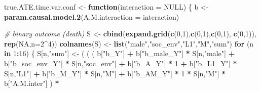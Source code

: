\documentclass[
]{book}
\newenvironment{Shaded}{\begin{snugshade}}{\end{snugshade}}
\newcommand{\AttributeTok}[1]{\textcolor[rgb]{0.13,0.29,0.53}{#1}}
\newcommand{\CommentTok}[1]{\textcolor[rgb]{0.56,0.35,0.01}{\textit{#1}}}
\newcommand{\ConstantTok}[1]{\textcolor[rgb]{0.56,0.35,0.01}{#1}}
\newcommand{\ControlFlowTok}[1]{\textcolor[rgb]{0.13,0.29,0.53}{\textbf{#1}}}
\newcommand{\DecValTok}[1]{\textcolor[rgb]{0.00,0.00,0.81}{#1}}
\newcommand{\FunctionTok}[1]{\textcolor[rgb]{0.13,0.29,0.53}{\textbf{#1}}}
\newcommand{\NormalTok}[1]{#1}
\newcommand{\OtherTok}[1]{\textcolor[rgb]{0.56,0.35,0.01}{#1}}
\newcommand{\SpecialCharTok}[1]{\textcolor[rgb]{0.81,0.36,0.00}{\textbf{#1}}}
\newcommand{\StringTok}[1]{\textcolor[rgb]{0.31,0.60,0.02}{#1}}
\begin{document}
\begin{Shaded}
\begin{Highlighting}[]
\NormalTok{true.ATE.time.var.conf }\OtherTok{\textless{}{-}} \ControlFlowTok{function}\NormalTok{(}\AttributeTok{interaction =} \ConstantTok{NULL}\NormalTok{) \{}
\NormalTok{  b }\OtherTok{\textless{}{-}} \FunctionTok{param.causal.model.2}\NormalTok{(}\AttributeTok{A.M.interaction =}\NormalTok{ interaction)}
  
  \CommentTok{\# binary outcome (death)}
\NormalTok{  S }\OtherTok{\textless{}{-}} \FunctionTok{cbind}\NormalTok{(}\FunctionTok{expand.grid}\NormalTok{(}\FunctionTok{c}\NormalTok{(}\DecValTok{0}\NormalTok{,}\DecValTok{1}\NormalTok{),}\FunctionTok{c}\NormalTok{(}\DecValTok{0}\NormalTok{,}\DecValTok{1}\NormalTok{),}\FunctionTok{c}\NormalTok{(}\DecValTok{0}\NormalTok{,}\DecValTok{1}\NormalTok{), }\FunctionTok{c}\NormalTok{(}\DecValTok{0}\NormalTok{,}\DecValTok{1}\NormalTok{)), }\FunctionTok{rep}\NormalTok{(}\ConstantTok{NA}\NormalTok{,}\AttributeTok{n=}\DecValTok{2}\SpecialCharTok{\^{}}\DecValTok{4}\NormalTok{))}
  \FunctionTok{colnames}\NormalTok{(S) }\OtherTok{\textless{}{-}} \FunctionTok{list}\NormalTok{(}\StringTok{"male"}\NormalTok{,}\StringTok{"soc\_env"}\NormalTok{,}\StringTok{"L1"}\NormalTok{,}\StringTok{"M"}\NormalTok{,}\StringTok{"sum"}\NormalTok{)}
  \ControlFlowTok{for}\NormalTok{ (n }\ControlFlowTok{in} \DecValTok{1}\SpecialCharTok{:}\DecValTok{16}\NormalTok{) \{}
\NormalTok{    S[n,}\StringTok{"sum"}\NormalTok{] }\OtherTok{\textless{}{-}}\NormalTok{ ( ( ( b[}\StringTok{"b\_Y"}\NormalTok{] }\SpecialCharTok{+} 
\NormalTok{                      b[}\StringTok{"b\_male\_Y"}\NormalTok{] }\SpecialCharTok{*}\NormalTok{ S[n,}\StringTok{"male"}\NormalTok{] }\SpecialCharTok{+} 
\NormalTok{                      b[}\StringTok{"b\_soc\_env\_Y"}\NormalTok{] }\SpecialCharTok{*}\NormalTok{ S[n,}\StringTok{"soc\_env"}\NormalTok{] }\SpecialCharTok{+} 
\NormalTok{                      b[}\StringTok{"b\_A\_Y"}\NormalTok{] }\SpecialCharTok{*} \DecValTok{1} \SpecialCharTok{+} 
\NormalTok{                      b[}\StringTok{"b\_L1\_Y"}\NormalTok{] }\SpecialCharTok{*}\NormalTok{ S[n,}\StringTok{"L1"}\NormalTok{] }\SpecialCharTok{+}
\NormalTok{                      b[}\StringTok{"b\_M\_Y"}\NormalTok{] }\SpecialCharTok{*}\NormalTok{ S[n,}\StringTok{"M"}\NormalTok{] }\SpecialCharTok{+}
\NormalTok{                      b[}\StringTok{"b\_AM\_Y"}\NormalTok{] }\SpecialCharTok{*} \DecValTok{1} \SpecialCharTok{*}\NormalTok{ S[n,}\StringTok{"M"}\NormalTok{] }\SpecialCharTok{*}\NormalTok{ b[}\StringTok{"A.M.inter"}\NormalTok{] ) }\SpecialCharTok{*}

\end{Highlighting}
\end{Shaded}
\end{document}
